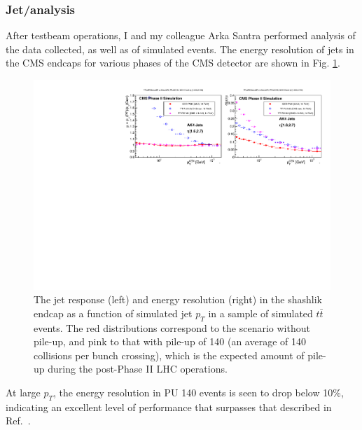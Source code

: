 \subsubsection{Jet/\MET analysis}
After testbeam operations, I and my colleague Arka Santra performed analysis of the data collected, as well as of simulated events. The energy resolution of jets in the CMS endcaps for various phases of the CMS detector are shown in Fig. \ref{fig:ShashlikResolution}.
\begin{figure}[h]
\centering
\includegraphics[width=0.9\linewidth]{figures/CMS/Upgrade/ChsJetPerformanceEndcapTT.pdf}
\caption{The jet response (left) and energy resolution (right) in the shashlik endcap as a function of simulated jet $p_T$ in a sample of simulated $t\bar{t}$ events. The red distributions correspond to the scenario without pile-up, and pink to that with pile-up of 140 (an average of 140 collisions per bunch crossing), which is the expected amount of pile-up during the post-Phase II LHC operations. }
\label{fig:ShashlikResolution}
\end{figure}
At large $p_T$, the energy resolution in PU 140 events is seen to drop below 10\%, indicating an excellent level of performance that surpasses that described in Ref.~\cite{Bilki:2015rla}.





